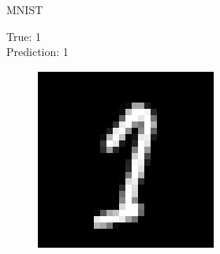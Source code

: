 \documentclass{beamer}
\begin{document}
\begin{frame}{MNIST}
\begin{minipage}[t]{0.32\columnwidth}
\begin{figure}
		\end{figure}
	\end{minipage}
	\begin{minipage}[t]{0.32\columnwidth}
		True: 1\\
		Prediction: 1
		\begin{figure}
			\includegraphics[width=1\columnwidth]{pres_pics/low_conf/11}
		\end{figure}
	\end{minipage}
\end{frame}
\end{document}
